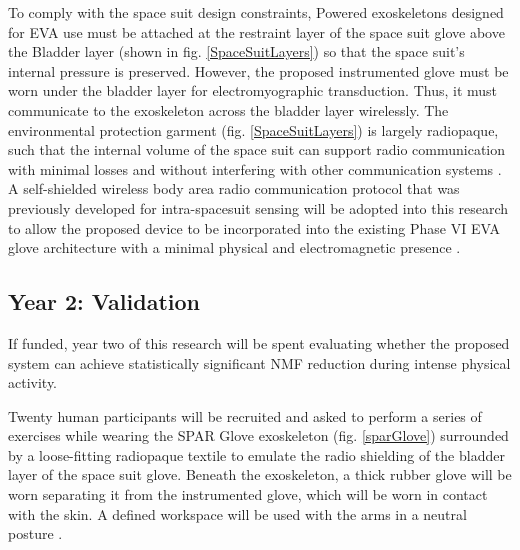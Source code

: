 \documentclass{article}
\begin{document}
To comply with the space suit design constraints, Powered exoskeletons designed for EVA use must be attached at the restraint layer of the space suit glove above the Bladder layer (shown in fig. \ref{SpaceSuitLayers}) so that the space suit's internal pressure is preserved. However, the proposed instrumented glove must be worn under the bladder layer for electromyographic transduction. Thus, it must communicate to the exoskeleton across the bladder layer wirelessly. The environmental protection garment (fig. \ref{SpaceSuitLayers}) is largely radiopaque, such that the internal volume of the space suit can support radio communication with minimal losses and without interfering with other communication systems \cite{Taj-Eldin:2015}. A self-shielded wireless body area radio communication protocol that was previously developed for intra-spacesuit sensing \cite{Taj-Eldin:2015} will be adopted into this research to allow the proposed device to be incorporated into the existing Phase VI EVA glove architecture with a minimal physical and electromagnetic presence \cite{Madden2017TheIO}.


\subsection{Year 2: Validation} 

If funded, year two of this research will be spent evaluating whether the proposed system can achieve statistically significant NMF reduction during intense physical activity.

Twenty human participants will be recruited and asked to perform a series of exercises while wearing the SPAR Glove exoskeleton (fig. \ref{sparGlove}) \cite{Rose2019HybridRH} surrounded by a loose-fitting radiopaque textile \cite{Taj-Eldin:2015} to emulate the radio shielding of the bladder layer of the space suit glove. Beneath the exoskeleton, a thick rubber glove will be worn separating it from the instrumented glove, which will be worn in contact with the skin. A defined workspace will be used with the arms in a neutral posture \cite{Madden2017TheIO, Rogers2017DevelopmentAT}.
\end{document}
